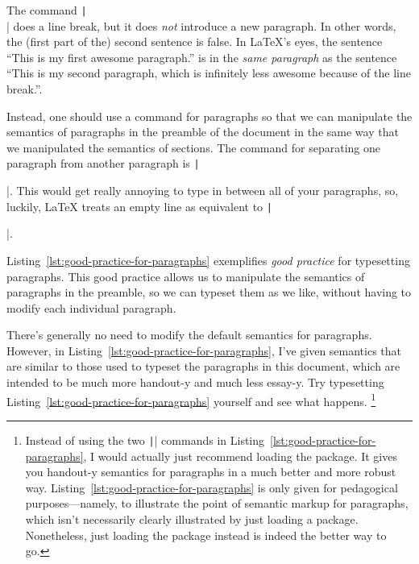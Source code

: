 The command \texttt|\\| does a line break, but it does \emph{not} introduce a new paragraph.
In other words, the (first part of the) second sentence is false.
In \LaTeX{}'s eyes, the sentence ``This is my first awesome paragraph.'' is in the \emph{same paragraph} as the sentence ``This is my second paragraph, which is infinitely less awesome because of the line break.''.

Instead, one should use a command for paragraphs so that we can manipulate the semantics of paragraphs in the preamble of the document in the same way that we manipulated the semantics of sections.
The command for separating one paragraph from another paragraph is \texttt|\par|.
This would get really annoying to type in between all of your paragraphs, so, luckily, \LaTeX{} treats an empty line as equivalent to \texttt|\par|.

Listing~\ref{lst:good-practice-for-paragraphs} exemplifies \emph{good practice} for typesetting paragraphs.
This good practice allows us to manipulate the semantics of paragraphs in the preamble, so we can typeset them as we like, without having to modify each individual paragraph.

There's generally no need to modify the default semantics for paragraphs.
However, in Listing~\ref{lst:good-practice-for-paragraphs}, I've given semantics that are similar to those used to typeset the paragraphs in this document, which are intended to be much more handout-y and much less essay-y.
Try typesetting Listing~\ref{lst:good-practice-for-paragraphs} yourself and see what happens.%
\footnote{%
Instead of using the two \texttt|\setlength| commands in Listing~\ref{lst:good-practice-for-paragraphs}, I would actually just recommend loading the  package.
It gives you handout-y semantics for paragraphs in a much better and more robust way.
Listing~\ref{lst:good-practice-for-paragraphs} is only given for pedagogical purposes---namely, to illustrate the point of semantic markup for paragraphs, which isn't necessarily clearly illustrated by just loading a package.
Nonetheless, just loading the  package instead is indeed the better way to go.%
}

